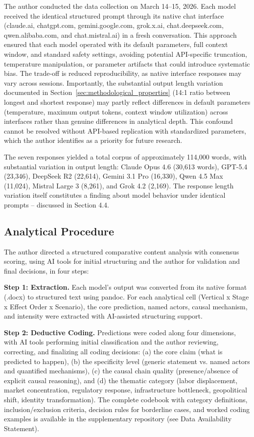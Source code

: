 \documentclass[preprint,review,12pt]{elsarticle}
\begin{document}
The author conducted the data collection on March 14--15, 2026. Each model received the identical structured prompt through its native chat interface (claude.ai, chatgpt.com, gemini.google.com, grok.x.ai, chat.deepseek.com, qwen.alibaba.com, and chat.mistral.ai) in a fresh conversation. This approach ensured that each model operated with its default parameters, full context window, and standard safety settings, avoiding potential API-specific truncation, temperature manipulation, or parameter artifacts that could introduce systematic bias. The trade-off is reduced reproducibility, as native interface responses may vary across sessions. Importantly, the substantial output length variation documented in Section~\ref{sec:methodological_properties} (14:1 ratio between longest and shortest response) may partly reflect differences in default parameters (temperature, maximum output tokens, context window utilization) across interfaces rather than genuine differences in analytical depth. This confound cannot be resolved without API-based replication with standardized parameters, which the author identifies as a priority for future research.

The seven responses yielded a total corpus of approximately 114,000 words, with substantial variation in output length: Claude Opus 4.6 (30,613 words), GPT-5.4 (23,346), DeepSeek R2 (22,614), Gemini 3.1 Pro (16,330), Qwen 4.5 Max (11,024), Mistral Large 3 (8,261), and Grok 4.2 (2,169). The response length variation itself constitutes a finding about model behavior under identical prompts -- discussed in Section 4.4.


\subsection{Analytical Procedure}
\label{sec:analytical_procedure}

The author directed a structured comparative content analysis with consensus scoring, using AI tools for initial structuring and the author for validation and final decisions, in four steps:

\textbf{Step 1: Extraction.} Each model's output was converted from its native format (.docx) to structured text using pandoc. For each analytical cell (Vertical x Stage x Effect Order x Scenario), the core prediction, named actors, causal mechanism, and intensity were extracted with AI-assisted structuring support.

\textbf{Step 2: Deductive Coding.} Predictions were coded along four dimensions, with AI tools performing initial classification and the author reviewing, correcting, and finalizing all coding decisions: (a) the core claim (what is predicted to happen), (b) the specificity level (generic statement vs. named actors and quantified mechanisms), (c) the causal chain quality (presence/absence of explicit causal reasoning), and (d) the thematic category (labor displacement, market concentration, regulatory response, infrastructure bottleneck, geopolitical shift, identity transformation). The complete codebook with category definitions, inclusion/exclusion criteria, decision rules for borderline cases, and worked coding examples is available in the supplementary repository (see Data Availability Statement).
\end{document}
